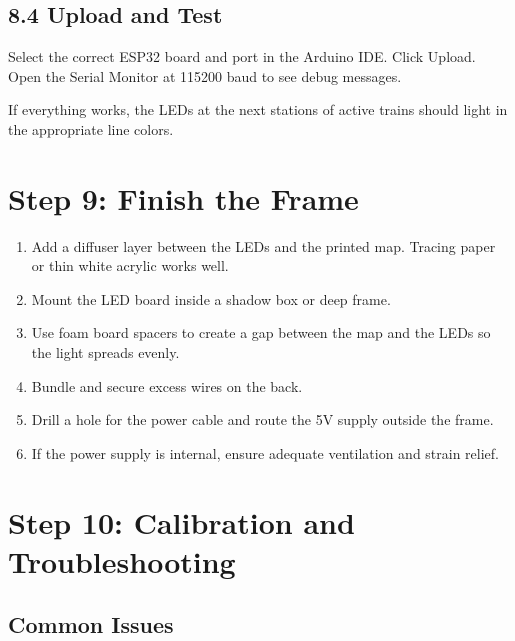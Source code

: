 \documentclass[11pt]{article}
\begin{document}
\subsection{8.4 Upload and Test}

Select the correct ESP32 board and port in the Arduino IDE. Click Upload. Open the Serial Monitor at 115200 baud to see debug messages.

If everything works, the LEDs at the next stations of active trains should light in the appropriate line colors.

\section{Step 9: Finish the Frame}

\begin{enumerate}
    \item Add a diffuser layer between the LEDs and the printed map. Tracing paper or thin white acrylic works well.
    \item Mount the LED board inside a shadow box or deep frame.
    \item Use foam board spacers to create a gap between the map and the LEDs so the light spreads evenly.
    \item Bundle and secure excess wires on the back.
    \item Drill a hole for the power cable and route the 5V supply outside the frame.
    \item If the power supply is internal, ensure adequate ventilation and strain relief.
\end{enumerate}

\section{Step 10: Calibration and Troubleshooting}

\subsection{Common Issues}
\end{document}
